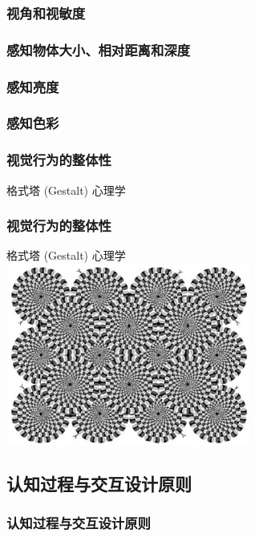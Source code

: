 \documentclass{beamer}
\begin{document}
\begin{frame}
	\frametitle{视角和视敏度}

\end{frame}

\begin{frame}
	\frametitle{感知物体大小、相对距离和深度}

\end{frame}

\begin{frame}
	\frametitle{感知亮度}

\end{frame}

\begin{frame}
	\frametitle{感知色彩}

\end{frame}

\begin{frame}
	\frametitle{视觉行为的整体性}
	\transwipe
	格式塔 (Gestalt) 心理学\\
	\begin{center}
	\end{center}
\end{frame}

\begin{frame}
	\frametitle{视觉行为的整体性}
	\transwipe
	格式塔 (Gestalt) 心理学\\
	\includegraphics[width=8cm]{images/gestalt1.jpg}
\end{frame}

\subsection{认知过程与交互设计原则}
\begin{frame}
	\frametitle{认知过程与交互设计原则}

\end{frame}
\end{document}
